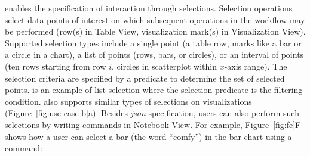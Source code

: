 
\vta enables the specification of interaction through selections. 
Selection operations select data points of interest on which subsequent operations in the workflow may be performed (\eg row(s) in Table View, visualization mark(s) in Visualization View). Supported selection types include a single point (\eg a table row, marks like a bar or a circle in a chart),
a list of points (\eg rows, bars, or circles), or an interval of points (\eg ten rows starting from row $i$, circles in scatterplot within $x$-axis range). The selection criteria are specified by a predicate to determine the set of selected points.  is an example of list selection where the selection predicate is the filtering condition. 
\vta also supports similar types of selections on visualizations (Figure~\ref{fig:use-case-b}a). Besides \emph{json} specification, users can also perform such selections by writing commands in Notebook View. For example, Figure~\ref{fig:fe}F shows how a user can select a bar (\eg the word ``comfy'') in the bar chart using a \vta command: 



